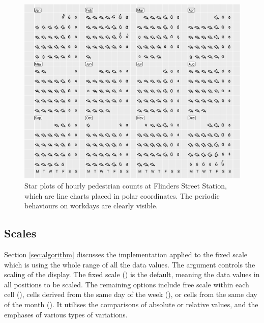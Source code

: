 \documentclass[article]{jss}
\begin{document}
\begin{CodeChunk}
\begin{figure}

{\centering \includegraphics[width=\textwidth]{figure/flinders-polar-1} 

}

\caption[Star plots of hourly pedestrian counts at Flinders Street Station, which are line charts placed in polar coordinates]{Star plots of hourly pedestrian counts at Flinders Street Station, which are line charts placed in polar coordinates. The periodic behaviours on workdays are clearly visible.}\label{fig:flinders-polar}
\end{figure}
\end{CodeChunk}

\subsection{Scales}\label{scales}

Section \ref{sec:algorithm} discusses the implementation applied to the
fixed scale which is using the whole range of all the data values. The
 argument controls the scaling of the display. The fixed
scale () is the default, meaning the data values in all
positions to be scaled. The remaining options include free scale within
each cell (), cells derived from the same day of the week
(), or cells from the same day of the month
(). It utilises the comparisons of absolute or relative
values, and the emphases of various types of variations.
\end{document}

